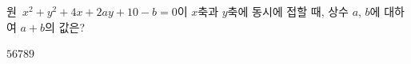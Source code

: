 원~$x^2+y^2+4x+2ay+10-b=0$이 $x$축과 $y$축에 동시에 접할 때, 상수 $a$, $b$에 대하여 $a+b$의 값은? 
\begin{choices32}{$5$}{$6$}{$7$}{$8$}{$9$}\end{choices32}
